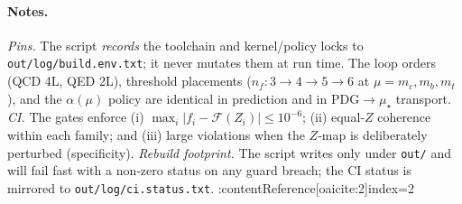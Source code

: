 \documentclass[epjc3]{svjour3}
\begin{document}
\paragraph{Notes.}
\emph{Pins.} The script \emph{records} the toolchain and kernel/policy locks to \texttt{out/log/build.env.txt}; it never mutates them at run time. The loop orders (QCD 4L, QED 2L), threshold placements ($n_f\!:3\!\to\!4\!\to\!5\!\to\!6$ at $\mu\!=\!m_c,m_b,m_t$), and the $\alpha(\mu)$ policy are identical in prediction and in PDG$\to\mu_\star$ transport. \emph{CI.} The gates enforce (i) $\max_i |f_i-\mathcal F(Z_i)|\le10^{-6}$; (ii) equal‑$Z$ coherence within each family; and (iii) large violations when the $Z$‑map is deliberately perturbed (specificity). \emph{Rebuild footprint.} The script writes only under \texttt{out/} and will fail fast with a non‑zero status on any guard breach; the CI status is mirrored to \texttt{out/log/ci.status.txt}. :contentReference[oaicite:2]{index=2}
\end{document}
